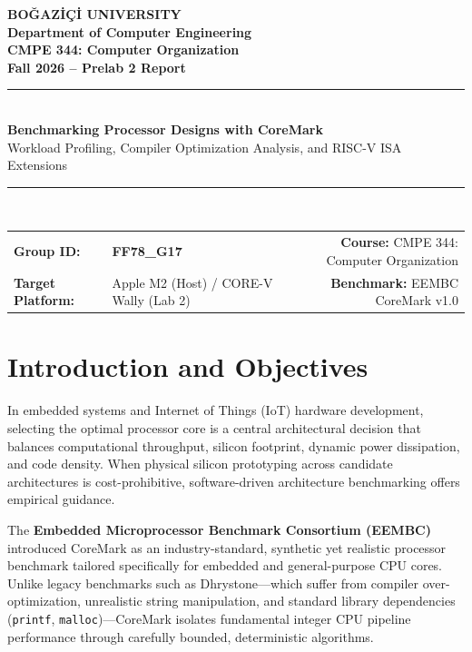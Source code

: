 \documentclass[11pt,a4paper]{article}
\begin{document}

\begin{center}
    {\LARGE \textbf{\textcolor{primaryblue}{BO\u{G}AZ\.{I}\c{C}\.{I} UNIVERSITY}}}\\[0.2em]
    {\large \textbf{Department of Computer Engineering}}\\[0.45em]
    {\Large \textbf{CMPE 344: Computer Organization}}\\[0.25em]
    {\large \textbf{Fall 2026 -- Prelab 2 Report}}\\[0.7em]
    \rule{\textwidth}{1.1pt}\\[0.5em]
    {\huge \textbf{Benchmarking Processor Designs with CoreMark}}\\[0.3em]
    {\large Workload Profiling, Compiler Optimization Analysis, and RISC-V ISA Extensions}\\[0.5em]
    \rule{\textwidth}{1.1pt}\\[0.7em]
\end{center}

\begin{table}[H]
\centering
\begin{tabularx}{\textwidth}{lX r}
    \textbf{Group ID:} & \textbf{FF78\_G17} & \textbf{Course:} CMPE 344: Computer Organization \\
    \textbf{Target Platform:} & Apple M2 (Host) / CORE-V Wally (Lab 2) & \textbf{Benchmark:} EEMBC CoreMark v1.0 \\
\end{tabularx}
\end{table}

\vspace{-0.3em}

\section{Introduction and Objectives}
In embedded systems and Internet of Things (IoT) hardware development, selecting the optimal processor core is a central architectural decision that balances computational throughput, silicon footprint, dynamic power dissipation, and code density. When physical silicon prototyping across candidate architectures is cost-prohibitive, software-driven architecture benchmarking offers empirical guidance.

The \textbf{Embedded Microprocessor Benchmark Consortium (EEMBC)} introduced CoreMark as an industry-standard, synthetic yet realistic processor benchmark tailored specifically for embedded and general-purpose CPU cores. Unlike legacy benchmarks such as Dhrystone---which suffer from compiler over-optimization, unrealistic string manipulation, and standard library dependencies (\texttt{printf}, \texttt{malloc})---CoreMark isolates fundamental integer CPU pipeline performance through carefully bounded, deterministic algorithms.
\end{document}

